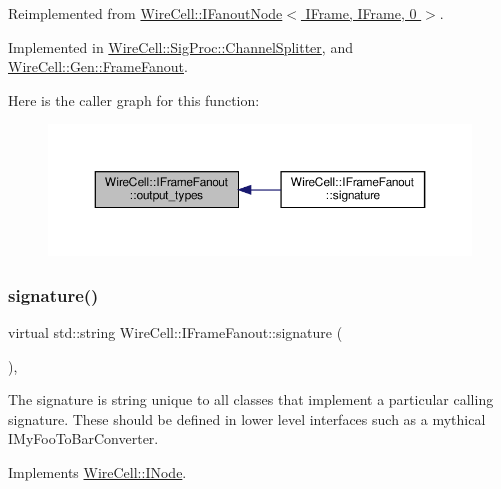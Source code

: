 Reimplemented from \hyperlink{class_wire_cell_1_1_i_fanout_node_a2191dc9d44b35d6ff4bda5d5356c6ac5}{Wire\+Cell\+::\+I\+Fanout\+Node$<$ I\+Frame, I\+Frame, 0 $>$}.



Implemented in \hyperlink{class_wire_cell_1_1_sig_proc_1_1_channel_splitter_aae5dd9627d127e38fd31d88a4b61b584}{Wire\+Cell\+::\+Sig\+Proc\+::\+Channel\+Splitter}, and \hyperlink{class_wire_cell_1_1_gen_1_1_frame_fanout_a71041fd4bf1a0e030e78a7565f7f1671}{Wire\+Cell\+::\+Gen\+::\+Frame\+Fanout}.

Here is the caller graph for this function\+:
\nopagebreak
\begin{figure}[H]
\begin{center}
\leavevmode
\includegraphics[width=350pt]{class_wire_cell_1_1_i_frame_fanout_aa54a33e4454b6d2cced872b903641d4a_icgraph}
\end{center}
\end{figure}
\mbox{\label{class_wire_cell_1_1_i_frame_fanout_af76c4f0a2dc33b08bcf3cad1d04b82f8}} 
\subsubsection{\texorpdfstring{signature()}{signature()}}
{\footnotesize\ttfamily virtual std\+::string Wire\+Cell\+::\+I\+Frame\+Fanout\+::signature (\begin{DoxyParamCaption}{ }\end{DoxyParamCaption})\hspace{0.3cm}{\ttfamily [inline]}, {\ttfamily [virtual]}}

The signature is string unique to all classes that implement a particular calling signature. These should be defined in lower level interfaces such as a mythical I\+My\+Foo\+To\+Bar\+Converter. 

Implements \hyperlink{class_wire_cell_1_1_i_node_a0b0763465adf5ba7febe8e378162b584}{Wire\+Cell\+::\+I\+Node}.



